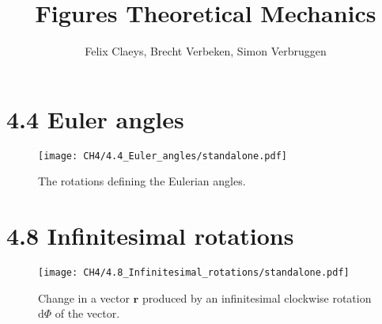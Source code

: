 \documentclass{book}
\title{Figures Theoretical Mechanics}
\author{Felix Claeys, Brecht Verbeken, Simon Verbruggen}
\begin{document}
\maketitle
\section*{4.4 Euler angles}
\begin{figure}[H]
\centering
\texttt{[image: CH4/4.4\_Euler\_angles/standalone.pdf]}
\caption{The rotations defining the Eulerian angles.}
\end{figure}

\section*{4.8 Infinitesimal rotations}
\begin{figure}[H]
\centering
\texttt{[image: CH4/4.8\_Infinitesimal\_rotations/standalone.pdf]}
\caption{Change in a vector $\boldsymbol{r}$ produced by an infinitesimal clockwise rotation $\mathrm{d}\Phi$ of the vector.}
\end{figure}
\end{document}
